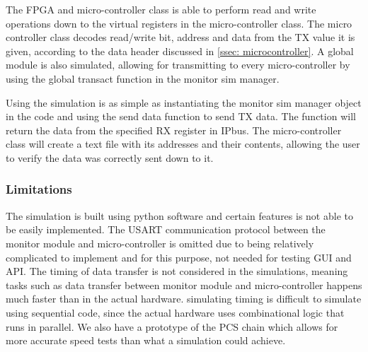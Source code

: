 \documentclass[main.tex]{subfiles}
\begin{document}
The FPGA and micro-controller class is able to perform read and write operations down to the virtual registers in the micro-controller class. The micro controller class decodes read/write bit, address and data from the TX value it is given, according to the data header discussed in \autoref{ssec: microcontroller}. A global module is also simulated, allowing for transmitting to every micro-controller by using the global transact function in the monitor sim manager. 

Using the simulation is as simple as instantiating the monitor sim manager object in the code and using the send data function to send TX data. The function will return the data from the specified RX register in IPbus. The micro-controller class will create a text file with its addresses and their contents, allowing the user to verify the data was correctly sent down to it.

\subsubsection{Limitations}

The simulation is built using python software and certain features is not able to be easily implemented. The USART communication protocol between the monitor module and micro-controller is omitted due to being relatively complicated to implement and for this purpose, not needed for testing GUI and API. 
The timing of data transfer is not considered in the simulations, meaning tasks such as data transfer between monitor module and micro-controller happens much faster than in the actual hardware. simulating timing is difficult to simulate using sequential code, since the actual hardware uses combinational logic that runs in parallel. We also have a prototype of the PCS chain which allows for more accurate speed tests than what a simulation could achieve. 
\end{document}
